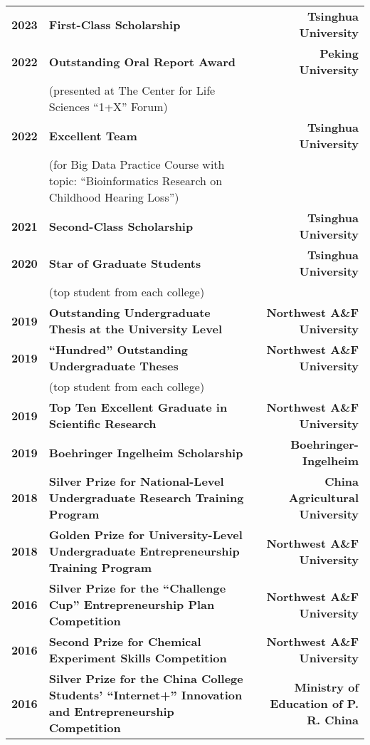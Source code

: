 \begin{longtable}[l]{@{}p{} p{} r}
    \textbf{2023} & \textbf{First-Class Scholarship} & \textbf{Tsinghua University} \\
    \textbf{2022} & \textbf{Outstanding Oral Report Award}  & \textbf{Peking University} \\
    & (presented at The Center for Life Sciences ``1+X'' Forum) & \\
    \textbf{2022} & \textbf{Excellent Team} & \textbf{Tsinghua University} \\
    &  (for Big Data Practice Course with topic: ``Bioinformatics Research on Childhood Hearing Loss'') & \\
    \textbf{2021} & \textbf{Second-Class Scholarship} & \textbf{Tsinghua University} \\
    \textbf{2020} & \textbf{Star of Graduate Students} & \textbf{Tsinghua University} \\
    & (top student from each college) & \\
    \textbf{2019} & \textbf{Outstanding Undergraduate Thesis at the University Level} & \textbf{Northwest A\&F University} \\
    \textbf{2019} & \textbf{``Hundred'' Outstanding Undergraduate Theses} & \textbf{Northwest A\&F University} \\
    & (top student from each college) & \\
    \textbf{2019} & \textbf{Top Ten Excellent Graduate in Scientific Research} & \textbf{Northwest A\&F University} \\
    \textbf{2019} & \textbf{Boehringer Ingelheim Scholarship} &\textbf{Boehringer-Ingelheim} \\
    \textbf{2018} & \textbf{Silver Prize for National-Level Undergraduate Research Training Program} & \textbf{China Agricultural University} \\
    \textbf{2018} & \textbf{Golden Prize for University-Level Undergraduate Entrepreneurship Training Program} & \textbf{Northwest A\&F University} \\
    \textbf{2016} & \textbf{Silver Prize for the ``Challenge Cup'' Entrepreneurship Plan Competition} & \textbf{Northwest A\&F University} \\
    \textbf{2016} & \textbf{Second Prize for Chemical Experiment Skills Competition} & \textbf{Northwest A\&F University} \\
    \textbf{2016} & \textbf{Silver Prize for the China College Students' ``Internet+'' Innovation and Entrepreneurship Competition} & \textbf{Ministry of Education of P. R. China} \\

\end{longtable}
